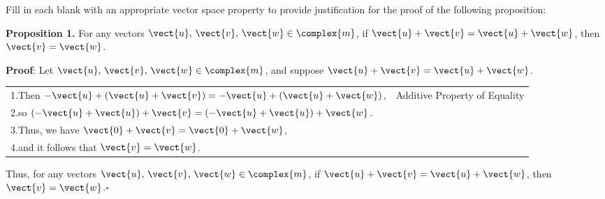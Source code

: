 Fill in each blank with an appropriate vector space property to provide justification for the proof of the following proposition:\par
%
{\bf Proposition 1.} 
For any vectors $\vect{u},\,\vect{v},\,\vect{w}\in\complex{m}$, 
if $\vect{u} + \vect{v} = \vect{u} + \vect{w}$, then $\vect{v} = \vect{w}$.\par
%
{\bf Proof}: 
Let $\vect{u},\,\vect{v},\,\vect{w}\in\complex{m}$, 
and suppose $\vect{u} + \vect{v} = \vect{u} + \vect{w}$.
\begin{center}
\begin{tabular}{ll}
1.\quad Then $-\vect{u} + (\vect{u} + \vect{v}) = -\vect{u} + (\vect{u} + \vect{w})$,&Additive Property of Equality\\
2.\quad so $(-\vect{u} + \vect{u}) + \vect{v} = (-\vect{u} + \vect{u}) + \vect{w}$.&\underline{\hspace*{2.0in}}\\
3.\quad Thus, we have $\vect{0} + \vect{v} = \vect{0} + \vect{w}$,&\underline{\hspace*{2.0in}}\\
4.\quad and it follows that $\vect{v} = \vect{w}$.&\underline{\hspace*{2.0in}}\\
\end{tabular}
\end{center}\par
%
Thus, for any vectors $\vect{u},\,\vect{v},\,\vect{w}\in\complex{m}$, 
if $\vect{u} + \vect{v} = \vect{u} + \vect{w}$, then $\vect{v} = \vect{w}$.\quad$\square$
